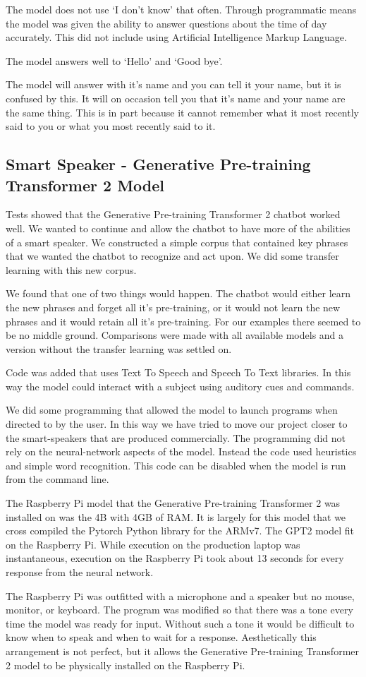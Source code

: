 The model does not use `I don't know' that often. Through programmatic means the model was given the ability to answer questions about the time of day accurately. This did not include using Artificial Intelligence Markup Language. 

The model answers well to `Hello' and `Good bye'.

The model will answer with it's name and you can tell it your name, but it is confused by this. It will on occasion tell you that it's name and your name are the same thing. This is in part because it cannot remember what it most recently said to you or what you most recently said to it. 

\subsection{Smart Speaker - Generative Pre-training Transformer 2 Model}
Tests showed that the Generative Pre-training Transformer 2 chatbot worked well. We wanted to continue and allow the chatbot to have more of the abilities of a smart speaker. We constructed a simple corpus that contained key phrases that we wanted the chatbot to recognize and act upon. We did some transfer learning with this new corpus.

We found that one of two things would happen. The chatbot would either learn the new phrases and forget all it's pre-training, or it would not learn the new phrases and it would retain all it's pre-training. For our examples there seemed to be no middle ground. Comparisons were made with all available models and a version without the transfer learning was settled on.

Code was added that uses Text To Speech and Speech To Text libraries. In this way the model could interact with a subject using auditory cues and commands.

We did some programming that allowed the model to launch programs when directed to by the user. In this way we have tried to move our project closer to the smart-speakers that are produced commercially. The programming did not rely on the neural-network aspects of the model. Instead the code used heuristics and simple word recognition. This code can be disabled when the model is run from the command line.

The Raspberry Pi model that the Generative Pre-training Transformer 2 was installed on was the 4B with 4GB of RAM. It is largely for this model that we cross compiled the Pytorch Python library for the ARMv7. The GPT2 model fit on the Raspberry Pi. While execution on the production laptop was instantaneous, execution on the Raspberry Pi took about 13 seconds for every response from the neural network.

The Raspberry Pi was outfitted with a microphone and a speaker but no mouse, monitor, or keyboard. The program was modified so that there was a tone every time the model was ready for input. Without such a tone it would be difficult to know when to speak and when to wait for a response. Aesthetically this arrangement is not perfect, but it allows the Generative Pre-training Transformer 2 model to be physically installed on the Raspberry Pi.
